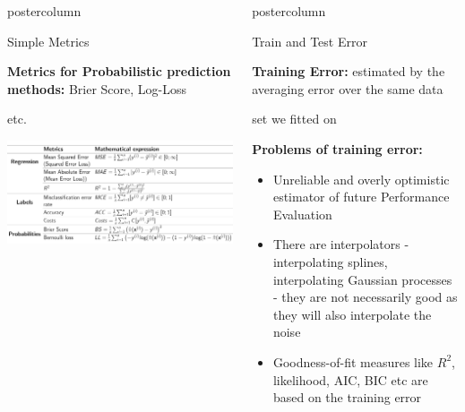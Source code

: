 \documentclass{beamer}
\begin{document}
\begin{frame}[fragile]{}
\begin{columns}
\begin{column}{.31\textwidth}
\begin{beamercolorbox}[center]{postercolumn}
\begin{minipage}{.98\textwidth}
{\begin{myblock}{Simple Metrics}
						\vspace*{1ex}
						
						\begin{codebox}
						\textbf{Metrics for Probabilistic prediction methods: }Brier Score, Log-Loss 
                        \end{codebox}
                        \begin{codebox}
						etc. \vspace*{1ex}
                        \end{codebox}
                     \includegraphics[width=1.05\columnwidth]{img/table_metric.PNG}
						\vspace*{1ex}
					\end{myblock}\vfill
				}
			\end{minipage}
		\end{beamercolorbox}
	\end{column}
	
	
	\begin{column}{.31\textwidth}
  \begin{beamercolorbox}[center]{postercolumn}
  \begin{minipage}{.98\textwidth}
  \parbox[t][\columnheight]{\textwidth}{
    \begin{myblock}{Train and Test Error}
        \begin{codebox}
    \textbf{Training Error: }estimated by the averaging error over the same data
    \end{codebox}
    \begin{codebox}
    set we fitted on
    \end{codebox}
    \hspace*{1ex}\textbf{Problems of training error: }
    
    \begin{itemize}[$\bullet$]
    \setlength{\itemindent}{+.3in}
    \item Unreliable and overly optimistic estimator of future Performance Evaluation
    \item There are interpolators - interpolating splines, interpolating Gaussian processes - they are not necessarily good as they will also interpolate the noise
    \item Goodness-of-fit measures like $R^2$, likelihood, AIC, BIC etc are based on the training error
    \end{itemize}
    

\end{myblock}}
\end{minipage}
\end{beamercolorbox}
\end{column}
\end{columns}
\end{frame}
\end{document}
